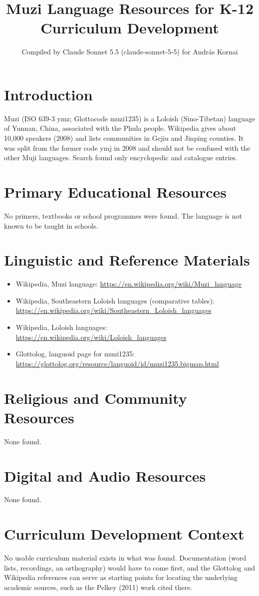 \documentclass[12pt]{article}
\title{Muzi Language Resources for K-12 Curriculum Development}
\author{Compiled by Claude Sonnet 5.5 (claude-sonnet-5-5) for Andr\'as Kornai}
\date{}
\begin{document}
\maketitle

\section{Introduction}
Muzi (ISO 639-3 ymz; Glottocode muzi1235) is a Loloish (Sino-Tibetan) language of Yunnan, China, associated with the Phula people. Wikipedia gives about 10,000 speakers (2008) and lists communities in Gejiu and Jinping counties. It was split from the former code ymj in 2008 and should not be confused with the other Muji languages. Search found only encyclopedic and catalogue entries.

\section{Primary Educational Resources}
No primers, textbooks or school programmes were found. The language is not known to be taught in schools.

\section{Linguistic and Reference Materials}
\begin{itemize}
\item Wikipedia, Muzi language: \url{https://en.wikipedia.org/wiki/Muzi_language}
\item Wikipedia, Southeastern Loloish languages (comparative tables): \url{https://en.wikipedia.org/wiki/Southeastern_Loloish_languages}
\item Wikipedia, Loloish languages: \url{https://en.wikipedia.org/wiki/Loloish_languages}
\item Glottolog, languoid page for muzi1235: \url{https://glottolog.org/resource/languoid/id/muzi1235.bigmap.html}
\end{itemize}

\section{Religious and Community Resources}
None found.

\section{Digital and Audio Resources}
None found.

\section{Curriculum Development Context}
No usable curriculum material exists in what was found. Documentation (word lists, recordings, an orthography) would have to come first, and the Glottolog and Wikipedia references can serve as starting points for locating the underlying academic sources, such as the Pelkey (2011) work cited there.
\end{document}
